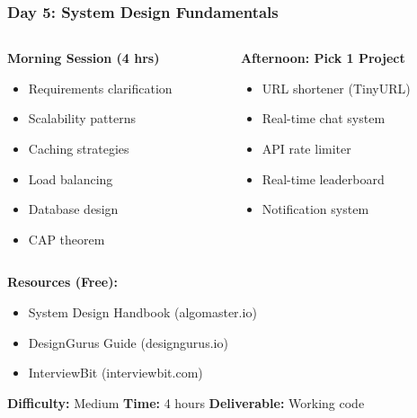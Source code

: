 \begin{frame}[fragile]\frametitle{Day 5: System Design Fundamentals}
\begin{columns}
    \begin{column}[T]{0.5\linewidth}
      \textbf{Morning Session (4 hrs)}
      \begin{itemize}
        \item Requirements clarification
        \item Scalability patterns
        \item Caching strategies
        \item Load balancing
        \item Database design
        \item CAP theorem
      \end{itemize}
    \end{column}
    \begin{column}[T]{0.5\linewidth}
      \textbf{Afternoon: Pick 1 Project}
      \begin{itemize}
        \item URL shortener (TinyURL)
        \item Real-time chat system
        \item API rate limiter
        \item Real-time leaderboard
        \item Notification system
      \end{itemize}
    \end{column}
  \end{columns}
  
  \vspace{0.3cm}
  \textbf{Resources (Free):}
  \begin{itemize}
    \item System Design Handbook (algomaster.io)
    \item DesignGurus Guide (designgurus.io)
    \item InterviewBit (interviewbit.com)
  \end{itemize}
  
\vspace{0.3cm}    
\textbf{Difficulty:} Medium \textbar \textbf{Time:} 4 hours \textbar \textbf{Deliverable:} Working code  
\end{frame}

